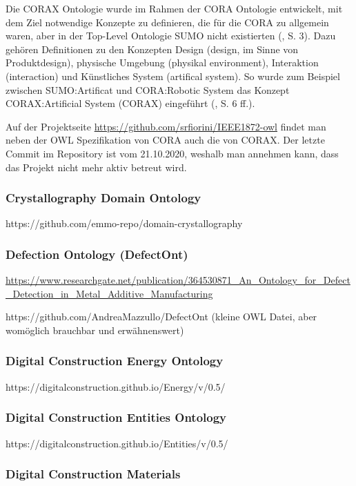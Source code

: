 \documentclass{article}
\begin{document}
Die CORAX Ontologie wurde im Rahmen der CORA Ontologie entwickelt, mit dem Ziel notwendige Konzepte zu definieren, die für die CORA zu allgemein waren, aber in der Top-Level Ontologie SUMO nicht existierten (\cite{fiorini2015extensions}, S. 3).
Dazu gehören Definitionen zu den Konzepten Design (design, im Sinne von Produktdesign), physische Umgebung (physikal environment), Interaktion (interaction) und Künstliches System (artifical system).
So wurde zum Beispiel zwischen SUMO:Artificat und CORA:Robotic System das Konzept CORAX:Artificial System (CORAX) eingeführt (\cite{fiorini2015extensions}, S. 6 ff.).

Auf der Projektseite \url{https://github.com/srfiorini/IEEE1872-owl} findet man neben der OWL Spezifikation von CORA auch die von CORAX. Der letzte Commit im Repository ist vom 21.10.2020, weshalb man annehmen kann, dass das Projekt nicht mehr aktiv betreut wird.

\subsubsection{Crystallography Domain Ontology}

https://github.com/emmo-repo/domain-crystallography

\subsubsection{Defection Ontology (DefectOnt)}

\url{https://www.researchgate.net/publication/364530871_An_Ontology_for_Defect_Detection_in_Metal_Additive_Manufacturing}

https://github.com/AndreaMazzullo/DefectOnt (kleine OWL Datei, aber womöglich brauchbar und erwähnenswert)

\subsubsection{Digital Construction Energy Ontology}

https://digitalconstruction.github.io/Energy/v/0.5/

\subsubsection{Digital Construction Entities Ontology}

https://digitalconstruction.github.io/Entities/v/0.5/

\subsubsection{Digital Construction Materials}
\end{document}
